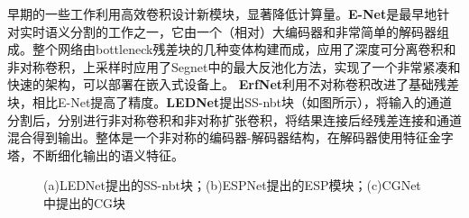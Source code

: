 \documentclass[11pt]{article}
\begin{document}
早期的一些工作利用高效卷积设计新模块，显著降低计算量。\textbf{E-Net}\cite{ref7}是最早地针对实时语义分割的工作之一，它由一个（相对）大编码器和非常简单的解码器组成。整个网络由bottleneck残差块的几种变体构建而成，应用了深度可分离卷积和非对称卷积，上采样时应用了Segnet中的最大反池化方法，实现了一个非常紧凑和快速的架构，可以部署在嵌入式设备上。
\textbf{ErfNet}\cite{ref15}利用不对称卷积改进了基础残差块，相比E-Net提高了精度。\textbf{LEDNet}\cite{ref16}提出SS-nbt块（如图所示），将输入的通道分割后，分别进行非对称卷积和非对称扩张卷积，将结果连接后经残差连接和通道混合得到输出。整体是一个非对称的编码器-解码器结构，在解码器使用特征金字塔，不断细化输出的语义特征。
\begin{figure}[htbp]
    \centering
    \centering
    \caption{(a)LEDNet\cite{ref16}提出的SS-nbt块；(b)ESPNet\cite{ref17}提出的ESP模块；(c)CGNet\cite{ref19}中提出的CG块}
\end{figure}
\end{document}
